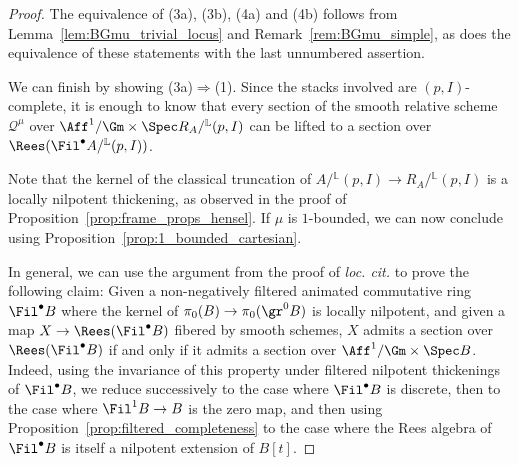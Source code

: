 \documentclass[10pt]{amsart}
\begin{document}
\begin{proof}
The equivalence of (3a), (3b), (4a) and (4b) follows from Lemma~\ref{lem:BGmu_trivial_locus} and Remark~\ref{rem:BGmu_simple}, as does the equivalence of these statements with the last unnumbered assertion.

We can finish by showing (3a)$\Rightarrow$(1). Since the stacks involved are $(p,I)$-complete, it is enough to know that every section of the smooth relative scheme $\mathcal{Q}^\mu$ over $\Aff^1/\Gm\times \Spec R_A/{}^{\mathbb{L}}(p,I)$ can be lifted to a section over $\Rees(\Fil^\bullet A/{}^{\mathbb{L}}(p,I))$.

Note that the kernel of the classical truncation of $A/{}^{\mathbb{L}}(p,I)\to R_A/{}^{\mathbb{L}}(p,I)$ is a locally nilpotent thickening, as observed in the proof of Proposition~\ref{prop:frame_props_hensel}. If $\mu$ is $1$-bounded, we can now conclude using Proposition~\ref{prop:1_bounded_cartesian}.

In general, we can use the argument from the proof of \emph{loc. cit.} to prove the following claim: Given a non-negatively filtered animated commutative ring $\Fil^\bullet B$ where the kernel of $\pi_0(B)\to \pi_0(\gr^0B)$ is locally nilpotent, and given a map $X\to \Rees(\Fil^\bullet B)$ fibered by smooth schemes, $X$ admits a section over $\Rees(\Fil^\bullet B)$ if and only if it admits a section over $\Aff^1/\Gm\times\Spec B$. Indeed, using the invariance of this property under filtered nilpotent thickenings of $\Fil^\bullet B$, we reduce successively to the case where $\Fil^\bullet B$ is discrete, then to the case where $\Fil^1B \to B$ is the zero map, and then using Proposition~\ref{prop:filtered_completeness} to the case where the Rees algebra of $\Fil^\bullet B$ is itself a nilpotent extension of $B[t]$.
\end{proof}
\end{document}
